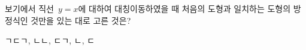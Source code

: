 보기에서 직선~$y=x$에 대하여 대칭이동하였을 때 처음의 도형과 일치하는 도형의 방정식인 것만을 있는 대로 고른 것은? 
\begin{choices32}{ㄱ}{ㄷ}{ㄱ, ㄴ}{ㄴ, ㄷ}{ㄱ, ㄴ, ㄷ}\end{choices32}
